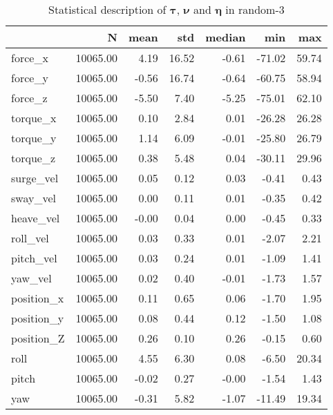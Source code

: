 \begin{table}[hb]
\centering
\caption{Statistical description of $\boldsymbol{\tau}$, $\boldsymbol{\nu}$ and $\boldsymbol{\eta}$ in random-3}
\label{tab:description-random-3}
\begin{tabular}{lrrrrrr}
\toprule
{} &        N &  mean &   std & median &    min &   max \\
\midrule
force\_x    & 10065.00 &  4.19 & 16.52 &  -0.61 & -71.02 & 59.74 \\
force\_y    & 10065.00 & -0.56 & 16.74 &  -0.64 & -60.75 & 58.94 \\
force\_z    & 10065.00 & -5.50 &  7.40 &  -5.25 & -75.01 & 62.10 \\
torque\_x   & 10065.00 &  0.10 &  2.84 &   0.01 & -26.28 & 26.28 \\
torque\_y   & 10065.00 &  1.14 &  6.09 &  -0.01 & -25.80 & 26.79 \\
torque\_z   & 10065.00 &  0.38 &  5.48 &   0.04 & -30.11 & 29.96 \\
surge\_vel  & 10065.00 &  0.05 &  0.12 &   0.03 &  -0.41 &  0.43 \\
sway\_vel   & 10065.00 &  0.00 &  0.11 &   0.01 &  -0.35 &  0.42 \\
heave\_vel  & 10065.00 & -0.00 &  0.04 &   0.00 &  -0.45 &  0.33 \\
roll\_vel   & 10065.00 &  0.03 &  0.33 &   0.01 &  -2.07 &  2.21 \\
pitch\_vel  & 10065.00 &  0.03 &  0.24 &   0.01 &  -1.09 &  1.41 \\
yaw\_vel    & 10065.00 &  0.02 &  0.40 &  -0.01 &  -1.73 &  1.57 \\
position\_x & 10065.00 &  0.11 &  0.65 &   0.06 &  -1.70 &  1.95 \\
position\_y & 10065.00 &  0.08 &  0.44 &   0.12 &  -1.50 &  1.08 \\
position\_Z & 10065.00 &  0.26 &  0.10 &   0.26 &  -0.15 &  0.60 \\
roll       & 10065.00 &  4.55 &  6.30 &   0.08 &  -6.50 & 20.34 \\
pitch      & 10065.00 & -0.02 &  0.27 &  -0.00 &  -1.54 &  1.43 \\
yaw        & 10065.00 & -0.31 &  5.82 &  -1.07 & -11.49 & 19.34 \\
\bottomrule
\end{tabular}
\end{table}
